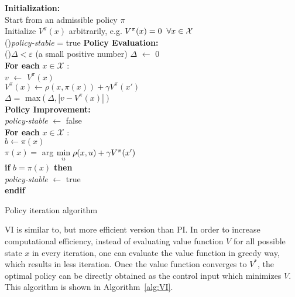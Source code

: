 \begin{algorithm}
	\textbf{Initialization:} \\
	Start from an admissible policy $ \pi $\\
	Initialize $V^{\pi}(x)$ arbitrarily, e.g. $ V^{\pi}(x) = 0 \hspace{2mm}  \forall x \in \mathcal{X} $ \\
	\Repeat(){\textit{policy-stable} = true}{	
	\textbf{Policy Evaluation:} \\
		\Repeat(){$ \Delta  <  \varepsilon $ (a small positive number)}{
		$ \Delta $ $ \leftarrow $ 0 \\
		\textbf{For each} $ x \in \mathcal{X} $ :\\
			\hspace{5mm} $ v $ $ \leftarrow $ $ V^{\pi}(x) $ \\
			\hspace{5mm} $ V^{\pi}(x) \leftarrow \rho(x, \pi(x)) +\gamma V^{\pi}(x') $ \\
			\hspace{5mm} $ \Delta = $ max$ (\Delta, |v-V^{\pi}(x)|) $ \\}
			\vspace{2mm}
	\textbf{Policy Improvement:} \\
		\textit{policy-stable} $ \leftarrow $ false \\
		\textbf{For each} $ x \in \mathcal{X} $ : \\
			\hspace{5mm} $ b \leftarrow \pi(x) $ \\
			\hspace{5mm} $ \pi(x)=$  arg $\underset{u}{\text{min}} \hspace{1mm} \rho(x, u) +\gamma V^{\pi}(x') $  \\
			\hspace{5mm} \textbf{if} $ b = \pi(x) $ \textbf{then} \\ 
			\hspace{10mm} \textit{policy-stable} $ \leftarrow $ true \\
			\hspace{5mm} \textbf{endif}
	}
\caption{Policy iteration algorithm}
\label{alg:PI}
\end{algorithm}

\acs{VI} is similar to, but more efficient version than \acs{PI}. In order to increase computational efficiency, instead of evaluating value function $V$ for all possible state $x$ in every iteration, one can evaluate the value function in greedy way, which results in less iteration. Once the value function converges to $V^*$, the optimal policy can be directly obtained as the control input which minimizes $V$. This algorithm is shown in Algorithm~\ref{alg:VI}. 

